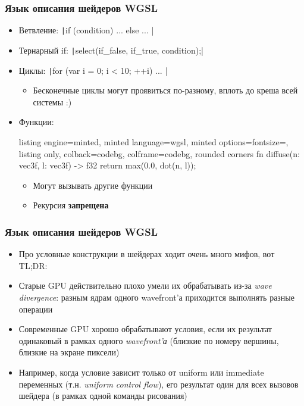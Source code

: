 \documentclass[10pt]{beamer}
\begin{document}
\begin{frame}[fragile]
\frametitle{Язык описания шейдеров WGSL}
\begin{itemize}
\item Ветвление: \texttt|if (condition) { ... } else { ... }|
\pause
\item Тернарный if: \texttt|select(if_false, if_true, condition);|
\pause
\item Циклы: \texttt|for (var i = 0; i < 10; ++i) { ... }|
\begin{itemize}
\item Бесконечные циклы могут проявиться по-разному, вплоть до креша всей системы :)
\end{itemize}
\pause
{}
\item Функции:
\begin{tcblisting}{listing engine=minted, minted language=wgsl, minted options={fontsize=\scriptsize}, listing only, colback=codebg, colframe=codebg, rounded corners}
fn diffuse(n: vec3f, l: vec3f) -> f32 {
    return max(0.0, dot(n, l));
}
\end{tcblisting}
\pause
\begin{itemize}
\item Могут вызывать другие функции
\pause
\item Рекурсия \textbf{запрещена}
\end{itemize}
\end{itemize}
\end{frame}

\begin{frame}[fragile]
\frametitle{Язык описания шейдеров WGSL}
\begin{itemize}
\item Про условные конструкции в шейдерах ходит очень много мифов, вот TL;DR:
\pause
\item Старые GPU действительно плохо умели их обрабатывать из-за \textit{wave divergence}: разным ядрам одного wavefront'а приходится выполнять разные операции
\pause
\item Современные GPU хорошо обрабатывают условия, если их результат одинаковый в рамках одного \textit{wavefront'а} (близкие по номеру вершины, близкие на экране пиксели)
\pause
\item Например, когда условие зависит только от uniform или immediate переменных (т.н. \textit{uniform control flow}), его результат один для всех вызовов шейдера (в рамках одной команды рисования)
\end{itemize}
\end{frame}
\end{document}
